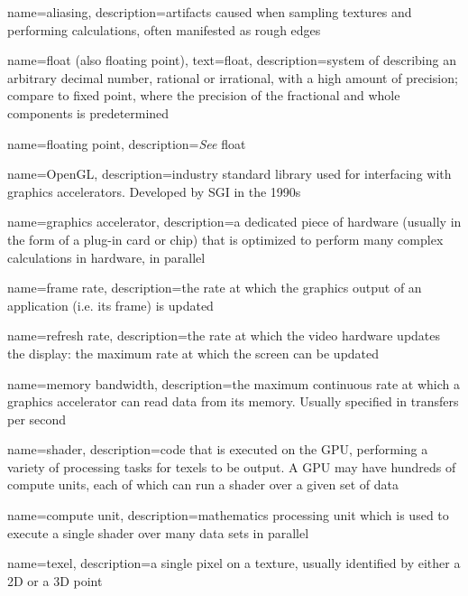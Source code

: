  {
  name=aliasing,
  description={artifacts caused when sampling textures and performing calculations, often manifested as rough edges}
}

 {
  name={float (\textmd{also} floating point)},
  text=float,
  description={system of describing an arbitrary decimal number, rational or irrational, with a high amount of precision; compare to fixed point, where the precision of the fractional and whole components is predetermined}
}

 {
	name=floating point,
	description={\emph{See} \gls{float}}
}

 {
  name=OpenGL,
  description={industry standard library used for interfacing with \glspl{graphics accelerator}. Developed by SGI in the 1990s}
}

 {
  name=graphics accelerator,
  description={a dedicated piece of hardware (usually in the form of a plug-in card or chip) that is optimized to perform many complex calculations in hardware, in parallel}
}

 {
  name=frame rate,
  description={the rate at which the graphics output of an application (i.e. its frame) is updated}
}

 {
  name=refresh rate,
  description={the rate at which the video hardware updates the display: the maximum rate at which the screen can be updated}
}

 {
  name=memory bandwidth,
  description={the maximum continuous rate at which a \gls{graphics accelerator} can read data from its memory. Usually specified in transfers per second}
}

 {
  name=shader,
  description={code that is executed on the GPU, performing a variety of processing tasks for \glspl{texel} to be output. A \gls{GPU} may have hundreds of \glspl{compute unit}, each of which can run a shader over a given set of data}
}

 {
  name=compute unit,
  description={mathematics processing unit which is used to execute a single \gls{shader} over many  data sets in parallel}
}

 {
  name=texel,
  description={a single pixel on a texture, usually identified by either a 2D or a 3D point}
}

